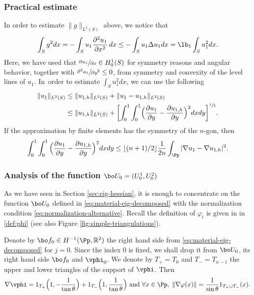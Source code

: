 \subsubsection*{Practical estimate} In order to estimate $ \|g\|_{L^2(S)}$ above, we notice that
\[
\int_S g^2dx = - \int_S u_1 \frac {\partial^2 u_1} {\partial x^2}\, dx\le - \int_S u_1 \Delta u_1dx= \lb_1 \int_S u_1^2dx.
\]
Here, we have used that $ \sfrac{\partial u_1}{\partial x}\in H^1_0(S)$ for symmetry reasons and angular behavior, together with $\sfrac {\partial^2 u_1} {\partial y^2} \le 0$, from symmetry and convexity of the level lines of $u_1$. In~order to estimate $ \int_S u_1^2dx$, we can use the following
\begin{align*}
\|u_1\|_{L^2(S)} &\le \|u_{1,h}\|_{L^2(S)}+\|u_1-u_{1,h}\|_{L^2(S)} \\
&\le \|u_{1,h}\|_{L^2(S)}+ \biggl[\int_{0}^{1} \int_0^{1} \Bigl(\frac{\partial u_1}{\partial y}-\frac{\partial u_{1,h}}{\partial y}\Bigr)^2 dx dy\biggr]^{\sfrac 12}.
\end{align*}
If the approximation by finite elements has the symmetry of the $n$-gon, then
\[
\int_{0}^{1} \int_0^{1} \Big (\frac{\partial u_1}{\partial y}-\frac{\partial u_{1,h}}{\partial y}\Big)^2 dx dy\le \lfloor (n+1)/2\rfloor \frac{1}{2n}\int_{\Pp} |\nabla u_1-\nabla u_{1,h} |^2.
\]

\subsubsection*{Analysis of the function $\bo U_0= (U_0^1, U_0^2)$} As we have seen in Section \ref{sec:eig-hessian}, it is enough to concentrate on the function $\bo U_0$ defined in \eqref{eq:material-eig-decomposed} with the normalization condition \eqref{eq:normalization-alternative}. Recall the definition of $\varphi_i$ is given in in \eqref{def:phi} (see also Figure \ref{fig:simple-triangulations}).

Denote by $\bo f_0\in H^{-1}(\Pp,\Bbb{R}^2)$ the right hand side from \eqref{eq:material-eig-decomposed} for $j=0$. Since the index $0$ is fixed, we shall drop it from $\bo U_0$, its right hand side $\bo f_0$ and $\vphi_0$. We denote by $T_+=T_0$ and $ T_-=T_{n-1}$ the upper and lower triangles of the support of $\vphi$. Then
\[
\nabla \vphi= 1_{T_+} \Bigl (1,-\frac{1}{\tan \theta }\Bigr) + 1_{T_-} \Bigl (1,\frac{1}{\tan \theta}\Bigr) \mbox{ and } \forall x \in \Pp, \; \|\nabla \varphi (x) \|= \frac{1}{\sin \theta} 1_{T_+\cup T_-}(x).
\]

